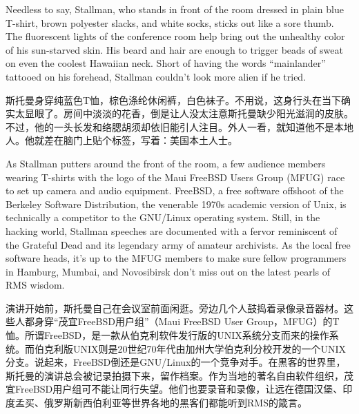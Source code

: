 \ifdefined\eng
Needless to say, Stallman, who stands in front of the room dressed in plain blue T-shirt, brown polyester slacks, and white socks, sticks out like a sore thumb. The fluorescent lights of the conference room help bring out the unhealthy color of his sun-starved skin.\ifdefined\vtwo {} \fi His beard and hair are enough to trigger beads of sweat on even the coolest Hawaiian neck. Short of having the words ``mainlander'' tattooed on his forehead, Stallman couldn't look more alien if he tried. \ifdefined{}\fi
\fi

\ifdefined\chs
斯托曼身穿纯蓝色T恤，棕色涤纶休闲裤，白色袜子。不用说，这身行头在当下确实太显眼了。房间中淡淡的花香，倒是让人没太注意斯托曼缺少阳光滋润的皮肤\ifdefined\vtwo {}\fi。不过，他的一头长发和络腮胡须却依旧能引人注目。外人一看，就知道他不是本地人。他就差在脑门上贴个标签，写着：美国本土人士\ifdefined{}\fi。

\fi

\ifdefined\eng
As Stallman putters around the front of the room, a few audience members wearing T-shirts with the logo of the Maui FreeBSD Users Group (MFUG) race to set up camera and audio equipment. FreeBSD, a free software offshoot of the Berkeley Software Distribution, the venerable 1970s academic version of Unix, is technically a competitor to the GNU/Linux operating system. Still, in the hacking world, Stallman speeches are documented with a fervor reminiscent of the Grateful Dead and its legendary army of amateur archivists. As the local free software heads, it's up to the MFUG members to make sure fellow programmers in Hamburg, Mumbai, and Novosibirsk don't miss out on the latest pearls of RMS wisdom.
\fi

\ifdefined\chs
演讲开始前，斯托曼自己在会议室前面闲逛。旁边几个人鼓捣着录像录音器材。这些人都身穿``茂宜FreeBSD用户组''（Maui FreeBSD User Group，MFUG）的T恤。所谓FreeBSD，是一款从伯克利软件发行版的UNIX系统分支而来的操作系统。而伯克利版UNIX则是20世纪70年代由加州大学伯克利分校开发的一个UNIX分支。说起来，FreeBSD倒还是GNU/Linux的一个竞争对手。在黑客的世界里，斯托曼的演讲总会被记录拍摄下来，留作档案。作为当地的著名自由软件组织，茂宜FreeBSD用户组可不能让同行失望。他们也要录音和录像，让远在德国汉堡、印度孟买、俄罗斯新西伯利亚等世界各地的黑客们都能听到RMS的箴言。
\fi

